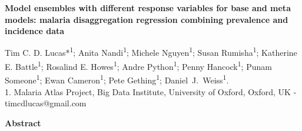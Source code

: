 \documentclass[11pt]{article}
\begin{document}



\small{

\begin{center}
\textbf{Model ensembles with different response variables for base and meta models: malaria disaggregation regression combining prevalence and incidence data}
\end{center}



\begin{center}
{Tim C. D. Lucas*\textsuperscript{1}; Anita Nandi\textsuperscript{1}; Michele Nguyen\textsuperscript{1}; 
Susan Rumisha\textsuperscript{1}; 
Katherine E. Battle\textsuperscript{1}; Rosalind E. Howes\textsuperscript{1}; Andre Python\textsuperscript{1}; Penny Hancock\textsuperscript{1}; Punam Someone\textsuperscript{1};
Ewan Cameron\textsuperscript{1}; Pete Gething\textsuperscript{1}; Daniel~J.~Weiss\textsuperscript{1}.}\\
{1. Malaria Atlas Project, Big Data Institute, University of Oxford, Oxford, UK - timcdlucas@gmail.com}\\ 


\end{center}

\begin{center}
{\bf Abstract}
\end{center}

\setlength{\parindent}{0pt}


}
\end{document}

